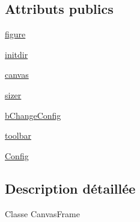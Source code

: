 \subsection*{Attributs publics}
\begin{DoxyCompactItemize}
\item 
\hyperlink{classwxpy__aot__pm10__by__year__sep__x__2009__v2_1_1_canvas_frame_a8e8b2e1dea08dccf777a56d75712ffc1}{figure}
\item 
\hyperlink{classwxpy__aot__pm10__by__year__sep__x__2009__v2_1_1_canvas_frame_a1890d92f42522e9ef11e8dbed8036015}{initdir}
\item 
\hyperlink{classwxpy__aot__pm10__by__year__sep__x__2009__v2_1_1_canvas_frame_a5dd5e8441fb7d4bfdfdfdad6c0fc7c04}{canvas}
\item 
\hyperlink{classwxpy__aot__pm10__by__year__sep__x__2009__v2_1_1_canvas_frame_a2316e595af6677c1eda90fe42fc719ab}{sizer}
\item 
\hyperlink{classwxpy__aot__pm10__by__year__sep__x__2009__v2_1_1_canvas_frame_aafaee18828675aed1d9ce40917c2c1ab}{b\-Change\-Config}
\item 
\hyperlink{classwxpy__aot__pm10__by__year__sep__x__2009__v2_1_1_canvas_frame_add8b71a2663ce00a7e77b490bbed6a61}{toolbar}
\item 
\hyperlink{classwxpy__aot__pm10__by__year__sep__x__2009__v2_1_1_canvas_frame_a65c22169047e5d96f1b4a603b6e48efb}{Config}
\end{DoxyCompactItemize}


\subsection{Description détaillée}
\begin{DoxyVerb}Classe CanvasFrame \end{DoxyVerb}
 

